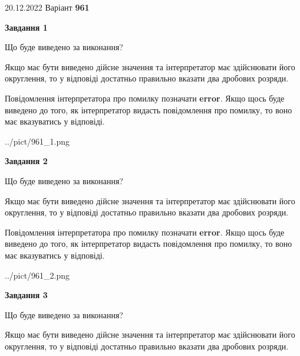 \documentclass[12pt, ukrainian]{article}
\begin{document}
{20.12.2022 Варіант \No \textbf { 961 }\par}
{
\begin {Large}

{\begin {center}\textbf{Завдання 1}\end {center}}\par
Що буде виведено за виконання? \par

Якщо має бути виведено дійсне значення та інтерпретатор має здійснювати його округлення, 
то у відповіді достатньо правильно вказати два дробових розряди.

Повідомлення інтерпретатора про помилку позначати \textbf{error}.
Якщо щось буде виведено до того, як інтерпретатор видасть повідомлення про помилку, 
то воно має вказуватись у відповіді. \par

\begin{center}
	{../pict/961_1.png}
\end{center}
\newpage

{\begin {center}\textbf{Завдання 2}\end {center}}\par
Що буде виведено за виконання? \par

Якщо має бути виведено дійсне значення та інтерпретатор має здійснювати його округлення, 
то у відповіді достатньо правильно вказати два дробових розряди.

Повідомлення інтерпретатора про помилку позначати \textbf{error}.
Якщо щось буде виведено до того, як інтерпретатор видасть повідомлення про помилку, 
то воно має вказуватись у відповіді. \par

\begin{center}
	{../pict/961_2.png}
\end{center}
\newpage

{\begin {center}\textbf{Завдання 3}\end {center}}\par
Що буде виведено за виконання? \par

Якщо має бути виведено дійсне значення та інтерпретатор має здійснювати його округлення, 
то у відповіді достатньо правильно вказати два дробових розряди.


\end{Large}}
\end{document}
